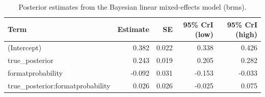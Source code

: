 \begin{table}
\centering
\caption{Posterior estimates from the Bayesian linear mixed-effects model (brms).}
\centering
\fontsize{10}{12}\selectfont
\begin{tabular}[t]{lrrrr}
\toprule
Term & Estimate & SE & 95\% CrI (low) & 95\% CrI (high)\\
\midrule
(Intercept) & 0.382 & 0.022 & 0.338 & 0.426\\
true\_posterior & 0.243 & 0.019 & 0.205 & 0.282\\
formatprobability & -0.092 & 0.031 & -0.153 & -0.033\\
true\_posterior:formatprobability & 0.026 & 0.026 & -0.025 & 0.075\\
\bottomrule
\end{tabular}
\end{table}
